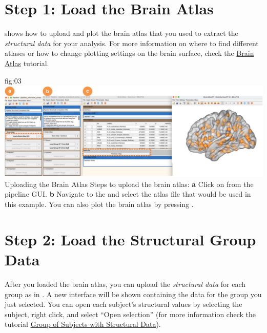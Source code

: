 \documentclass[justified]{tufte-handout}
\begin{document}
\section{Step 1: Load the Brain Atlas}
 shows how to upload and plot the brain atlas that you used to extract the \emph{structural data} for your analysis. For more information on where to find different atlases or how to change plotting settings on the brain surface, check the \href{https://github.com/braph-software/BRAPH-2/tree/develop/tutorials/general/tut_ba}{Brain Atlas} tutorial.

	{fig:03}
	{
	\includegraphics{fig03.jpg}
	}
	{Uploading the Brain Atlas}
	{
	Steps to upload the brain atlas:
	{\bf a} Click on  from the pipeline GUI.
	{\bf b} Navigate to the  and select the atlas file  that would be used in this example. You can also plot the brain atlas by pressing . 
	}
 
\section{Step 2: Load the Structural Group Data}

After you loaded the brain atlas, you can upload the \emph{structural data} for each group as in . A new interface will be shown containing the data for the group you just selected. You can open each subject’s structural values by selecting the subject, right click, and select “Open selection” (for more information check the tutorial \href{https://github.com/braph-software/BRAPH-2/tree/develop/tutorials/general/tut_gr_st}{Group of Subjects with Structural Data}).	
\end{document}
